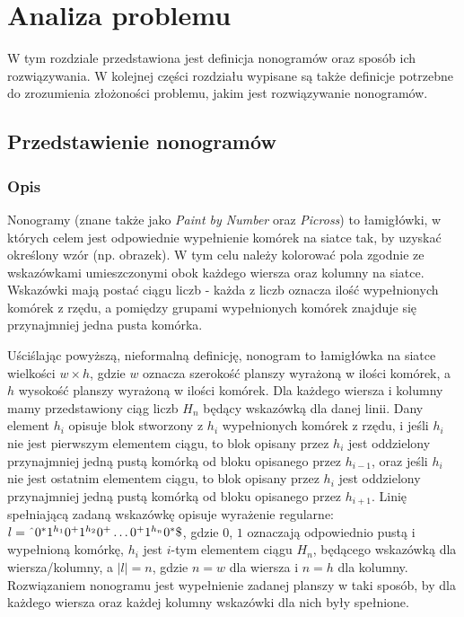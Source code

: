 \chapter{Analiza problemu}
\thispagestyle{chapterBeginStyle}
\label{rozdzial1}

    W tym rozdziale przedstawiona jest definicja nonogramów oraz sposób ich rozwiązywania.
W kolejnej części rozdziału wypisane są także definicje potrzebne do zrozumienia złożoności problemu,
jakim jest rozwiązywanie nonogramów.



\section{Przedstawienie nonogramów}


\subsection{Opis}
    Nonogramy (znane także jako \textit{Paint by Number} oraz \textit{Picross}) to łamigłówki, w których
celem jest odpowiednie wypełnienie komórek na siatce tak, by uzyskać określony wzór (np. obrazek).
W tym celu należy kolorować pola zgodnie ze wskazówkami umieszczonymi obok każdego wiersza oraz kolumny
na siatce. Wskazówki mają postać ciągu liczb - każda z liczb oznacza ilość wypełnionych komórek z rzędu,
a pomiędzy grupami wypełnionych komórek znajduje się przynajmniej jedna pusta komórka.

    Uściślając powyższą, nieformalną definicję, nonogram to łamigłówka na siatce wielkości $w \times h$,
gdzie $w$ oznacza szerokość planszy wyrażoną w ilości komórek, a $h$ wysokość planszy wyrażoną w
ilości komórek. Dla każdego wiersza i kolumny mamy przedstawiony ciąg liczb $H_n$ będący wskazówką
dla danej linii. Dany element $h_i$ opisuje blok stworzony z $h_i$ wypełnionych komórek z rzędu, i
jeśli $h_i$ nie jest pierwszym elementem ciągu, to blok opisany przez $h_i$ jest oddzielony 
przynajmniej jedną pustą komórką od bloku opisanego przez $h_{i-1}$, 
oraz jeśli $h_i$ nie jest ostatnim elementem ciągu, to blok opisany przez $h_i$ jest oddzielony
przynajmniej jedną pustą komórką od bloku opisanego przez $h_{i+1}$. Linię spełniającą zadaną wskazówkę
opisuje wyrażenie regularne: $l=\text{\^{}}0^*1^{h_1}0^+1^{h_2}0^+\ldots0^+1^{h_n}0^*\text{\$}$, gdzie 
$0$, $1$ oznaczają odpowiednio pustą i wypełnioną komórkę, $h_i$ jest $i$-tym elementem ciągu $H_n$,
będącego wskazówką dla wiersza/kolumny, a $|l| = n$, gdzie $n = w$ dla wiersza i $n = h$ dla kolumny. 
Rozwiązaniem nonogramu jest wypełnienie zadanej planszy w taki sposób, 
by dla każdego wiersza oraz każdej kolumny wskazówki dla nich były spełnione.

